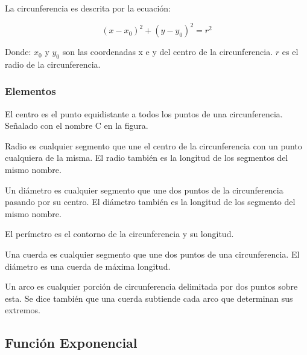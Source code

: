     La circunferencia es descrita por la ecuación:


    $$ (x-x_0)^2+(y-y_0)^2 = r^2 $$


    Donde: $x_0$ y $y_0$ son las coordenadas x e y del centro de la circunferencia.
    $r$ es el radio de la circunferencia.

    \subsubsection*{Elementos} \label{Elementos}

    El centro es el punto equidistante a todos los puntos de una
    circunferencia. Señalado con el nombre  C en la figura.

    Radio es cualquier segmento que une el centro de la circunferencia con
    un punto cualquiera de la misma. El radio también es la longitud de los
    segmentos del mismo nombre.

    Un  diámetro es cualquier segmento que une dos puntos de la circunferencia
    pasando por su centro. El diámetro también es la longitud de los segmento
    del mismo nombre.

    El perímetro es el contorno de la circunferencia y su longitud.

    Una cuerda es cualquier segmento que une dos puntos de una circunferencia.
    El diámetro es una cuerda de máxima longitud.

    Un arco es cualquier porción de circunferencia delimitada por dos puntos
    sobre esta. Se dice también que una cuerda subtiende cada arco que
    determinan sus extremos.





\subsection{Función Exponencial}

